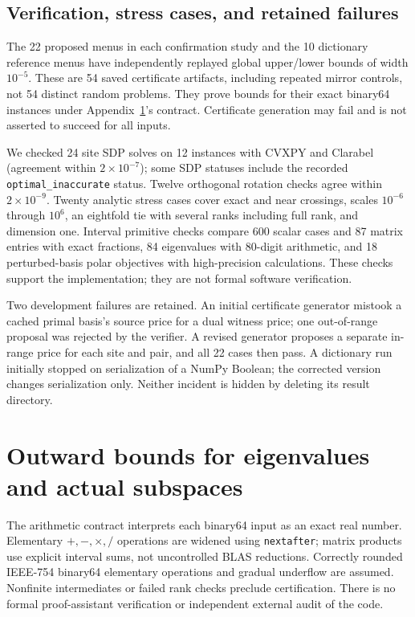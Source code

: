 \documentclass[11pt]{article}
\begin{document}
\subsection{Verification, stress cases, and retained failures}
The 22 proposed menus in each confirmation study and the 10 dictionary
reference menus have independently replayed global upper/lower bounds of
width $10^{-5}$. These are 54 saved certificate artifacts, including repeated
mirror controls, not 54 distinct random problems. They prove bounds for
their exact binary64 instances under Appendix~\ref{app:interval}'s contract.
Certificate generation may fail and is not asserted to succeed for all inputs.

We checked 24 site SDP solves on 12 instances with CVXPY and Clarabel
(agreement within $2\times10^{-7}$); some SDP statuses
include the recorded \texttt{optimal\_inaccurate} status. Twelve orthogonal
rotation checks agree within $2\times10^{-9}$. Twenty analytic stress cases
cover exact and near crossings, scales $10^{-6}$ through $10^6$, an eightfold
tie with several ranks including full rank, and dimension one. Interval
primitive checks compare 600 scalar cases and 87 matrix entries with exact
fractions, 84 eigenvalues with 80-digit arithmetic, and 18 perturbed-basis
polar objectives with high-precision calculations. These checks support the
implementation; they are not formal software verification.

Two development failures are retained. An initial certificate generator
mistook a cached primal basis's source price for a dual witness price;
one out-of-range proposal was rejected by the verifier. A revised generator
proposes a separate in-range price for each site and pair, and all 22 cases
then pass. A dictionary run initially stopped on serialization of a NumPy
Boolean; the corrected version changes serialization only. Neither incident
is hidden by deleting its result directory.




\section{Outward bounds for eigenvalues and actual subspaces}\label{app:interval}
The arithmetic contract interprets each binary64 input as an exact real
number. Elementary $+,-,\times,/$ operations are widened using
\texttt{nextafter}; matrix products use explicit interval sums, not
uncontrolled BLAS reductions. Correctly rounded IEEE-754 binary64 elementary
operations and gradual underflow are assumed. Nonfinite intermediates or
failed rank checks preclude certification. There is no formal proof-assistant
verification or independent external audit of the code.
\end{document}
